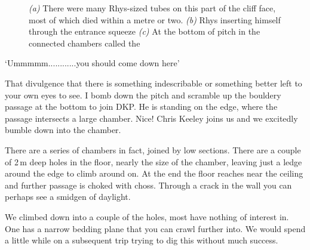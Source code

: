 \begin{figure*}[t!]
\checkoddpage \ifoddpage \forcerectofloat \else \forceversofloat \fi
\centering
\begin{subfigure}[t]{0.42\textwidth}
\centering
{}
 \caption{}\label{water chamber below helm's deep}
\end{subfigure}
    \hfill
    \begin{subfigure}[t]{0.56\textwidth}
        \centering
        \caption{} \label{HelmsDeep}
    \end{subfigure}
    
    \vspace{0.3cm}
    \begin{subfigure}[t]{\textwidth}
    \centering
        \caption{} \label{Touching the Void}
    \end{subfigure}
    \caption{
    \emph{(a)} There were many Rhys-sized tubes on this part of the cliff face, most of which died within a metre or two.
    \emph{(b)} Rhys inserting himself through the entrance squeeze 
    \emph{(c)} At the bottom of \protect{} pitch in the connected chambers called the \protect{} }
\end{figure*}

`Ummmmm............you should come down here'
 
 That divulgence that there is something indescribable or something better left to your own eyes to see. I bomb down the pitch and scramble up the bouldery passage at the bottom to join DKP. He is standing on the edge, where the passage intersects  a large chamber. Nice! Chris Keeley joins us and we excitedly bumble down into the chamber.
 
There are a series of chambers in fact, joined by low sections. There are a couple of 2\,m deep holes in the floor, nearly the size of the chamber, leaving just a ledge around the edge to climb around on. At the end the floor reaches near the ceiling and further passage is choked with choss. Through a crack in the wall you can perhaps see a smidgen of daylight.
 
We climbed down into a couple of the holes, most have nothing of interest in. One has a narrow bedding plane that you can crawl further into. We would spend a little while on a subsequent trip trying to dig this without much success. 
 
